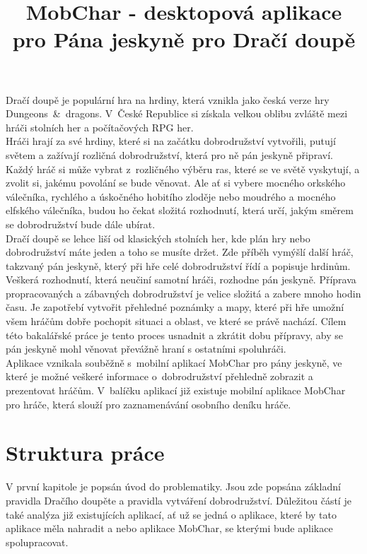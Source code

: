 \documentclass[thesis=B,czech]{resources/FITthesis}[2012/06/26]
\title{	MobChar - desktopová aplikace pro Pána jeskyně pro Dračí doupě}
\begin{document}

\begin{introduction}
Dračí doupě je populární hra na hrdiny, která vznikla jako česká verze hry Dungeons~\&~dragons. V~České Republice si získala velkou oblibu zvláště mezi hráči stolních her a počítačových RPG her.\\

Hráči hrají za své hrdiny, které si na začátku dobrodružství vytvořili, putují světem a zažívají rozličná dobrodružství, která pro ně pán jeskyně připraví. Každý hráč si může vybrat z~rozličného výběru ras, které se ve světě vyskytují, a zvolit si, jakému povolání se bude věnovat. Ale ať si vybere mocného orkského válečníka, rychlého a úskočného hobitího zloděje nebo moudrého a mocného elfského válečníka, budou ho čekat složitá rozhodnutí, která určí, jakým směrem se dobrodružství bude dále ubírat. \\

Dračí doupě se lehce liší od klasických stolních her, kde plán hry nebo dobrodružství máte jeden a toho se musíte držet. Zde příběh vymýšlí další hráč, takzvaný pán jeskyně, který při hře celé dobrodružství řídí a popisuje hrdinům. Veškerá rozhodnutí, která neučiní samotní hráči, rozhodne pán jeskyně. Příprava propracovaných a zábavných dobrodružství je velice složitá a zabere mnoho hodin času. Je zapotřebí vytvořit přehledné poznámky a mapy, které při hře umožní všem hráčům dobře pochopit situaci a oblast, ve které se právě nachází. Cílem této bakalářské práce je tento proces usnadnit a zkrátit dobu přípravy, aby se pán jeskyně mohl věnovat převážně hraní s ostatními spoluhráči. \\

Aplikace vznikala souběžně s~mobilní aplikací MobChar pro pány jeskyně, ve které je možné veškeré 	informace o~dobrodružství přehledně zobrazit a prezentovat hráčům. V~balíčku aplikací již existuje mobilní aplikace MobChar pro hráče, která slouží pro zaznamenávání osobního deníku hráče. \\


\section*{Struktura práce}
V první kapitole je popsán úvod do problematiky. Jsou zde popsána základní pravidla Dračího doupěte a pravidla vytváření dobrodružství. Důležitou částí je také analýza již existujících aplikací, ať už se jedná o aplikace, které by tato aplikace měla nahradit a nebo aplikace MobChar, se kterými bude aplikace spolupracovat.


\end{introduction}
\end{document}
